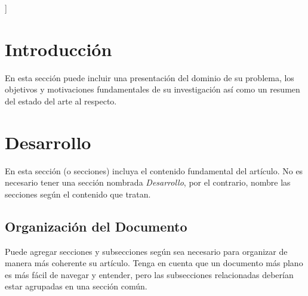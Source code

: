 \documentclass[a4paper,10pt,twocolumn]{article}
\begin{document}
\vspace{0.8cm}
]



\section{Introducción}\label{sec:intro}
  En esta sección puede incluir una presentación del dominio de su problema,
  los objetivos y motivaciones fundamentales de su investigación así como un
  resumen del estado del arte al respecto.




\section{Desarrollo}\label{sec:dev}
  En esta sección (o secciones) incluya el contenido fundamental del artículo.
  No es necesario tener una sección nombrada \emph{Desarrollo}, por el contrario,
  nombre las secciones según el contenido que tratan.

	\subsection{Organización del Documento}\label{sub:results}
		Puede agregar secciones y subsecciones según sea necesario para organizar
		de manera más coherente su artículo. Tenga en cuenta que un documento más
		plano es más fácil de navegar y entender, pero las subsecciones relacionadas
		deberían estar agrupadas en una sección común.
\end{document}
